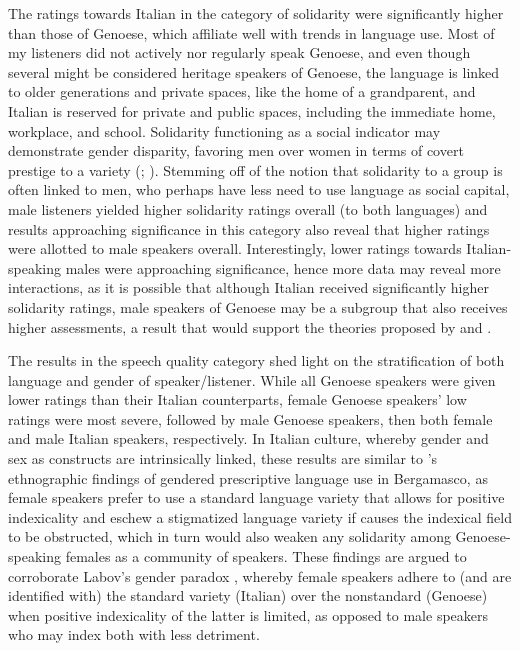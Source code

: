 \documentclass[output=paper,colorlinks,citecolor=brown]{langscibook}
\begin{document}
\par The ratings towards Italian in the category of solidarity were significantly higher than those of Genoese, which affiliate well with trends in language use. Most of my listeners did not actively nor regularly speak Genoese, and even though several might be considered heritage speakers of Genoese, the language is linked to older generations and private spaces, like the home of a grandparent, and Italian is reserved for private and public spaces, including the immediate home, workplace, and school. Solidarity functioning as a social indicator may demonstrate gender disparity, favoring men over women in terms of covert prestige to a variety (\cite{labo72}; \cite{trud72}). Stemming off of the notion that solidarity to a group is often linked to men, who perhaps have less need to use language as social capital, male listeners yielded higher solidarity ratings overall (to both languages) and results approaching significance in this category also reveal that higher ratings were allotted to male speakers overall. Interestingly, lower ratings towards Italian-speaking males were approaching significance, hence more data may reveal more interactions, as it is possible that although Italian received significantly higher solidarity ratings, male speakers of Genoese may be a subgroup that also receives higher assessments, a result that would support the theories proposed by \cite{labo72} and \cite{trud72}. 
\par The results in the speech quality category shed light on the stratification of both language and gender of speaker/listener. While all Genoese speakers were given lower ratings than their Italian counterparts, female Genoese speakers’ low ratings were most severe, followed by male Genoese speakers, then both female and male Italian speakers, respectively. In Italian culture, whereby gender and sex as constructs are intrinsically linked, these results are similar to \citeauthor{cava06}’s ethnographic findings \citeyear{cava06} of gendered prescriptive language use in Bergamasco, as female speakers prefer to use a standard language variety that allows for positive indexicality and eschew a stigmatized language variety if causes the indexical field to be obstructed, which in turn would also weaken any solidarity among Genoese-speaking females as a community of speakers. These findings are argued to corroborate Labov’s gender paradox \citep{labo01}, whereby female speakers adhere to (and are identified with) the standard variety (Italian) over the nonstandard (Genoese) when positive indexicality of the latter is limited, as opposed to male speakers who may index both with less detriment.
\end{document}

